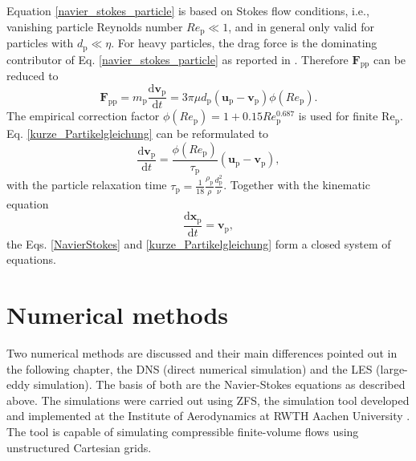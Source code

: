 \documentclass[11pt,a4paper,openany,oneside,parskip=half*]{article}
\renewcommand*\vec[1]{\boldsymbol{#1}}
\begin{document}
Equation \eqref{navier_stokes_particle} is based on Stokes flow conditions, i.e., vanishing particle Reynolds number $Re_\mathrm{p} \ll 1$, and in general only valid for particles with $d_\mathrm{p} \ll \eta$.
For heavy particles, the drag force is the dominating contributor of Eq. \eqref{navier_stokes_particle} as reported in \cite{TheImportanceOfTheFocusActingOnParticlesInTurbulentFlows}. Therefore $\vec{F}_\mathrm{pp}$ can be reduced to
\begin{equation} \label{kurze_Partikelgleichung}
\vec{F}_\mathrm{pp} =  m_\mathrm{p} \frac{\mathrm{d}\vec{v}_\mathrm{p}}{\mathrm{d}t} = 3 \pi \mu d_\mathrm{p}(\vec{u}_\mathrm{p}-\vec{v}_\mathrm{p})\phi(Re_\mathrm{p}).
\end{equation}
The empirical correction factor $\phi(Re_\mathrm{p}) = 1+0.15Re_\mathrm{p}^\mathrm{0.687}$ is used for finite $\mathrm{Re_\mathrm{p}}$. \newline Eq. \eqref{kurze_Partikelgleichung} can be reformulated to
\begin{equation} \label{shortPaticleDynamics}
\frac{\mathrm{d}\vec{v}_\mathrm{p}}{\mathrm{d}t} = \frac{\phi(Re_\mathrm{p})}{\tau_\mathrm{p}}(\vec{u}_\mathrm{p}-\vec{v}_\mathrm{p}),
\end{equation}
with the particle relaxation time $\tau_\mathrm{p}=\frac{1}{18}\frac{\rho_\mathrm{p}}{\rho}\frac{d_\mathrm{p}^\mathrm{2}}{\nu}$. 
\newline
Together with the kinematic equation    
\begin{equation}
 \frac{\mathrm{d}\vec{x}_\mathrm{p}}{\mathrm{d}t} = \vec{v}_\mathrm{p},
\end{equation}
the Eqs.  \eqref{NavierStokes} and \eqref{kurze_Partikelgleichung} form a closed system of equations.
\pagebreak
\section{Numerical methods} %
Two numerical methods are discussed and their main differences pointed out in the following chapter, the DNS (direct numerical simulation) and the LES (large-eddy simulation). The basis of both are the Navier-Stokes equations as described above. The simulations were carried out using ZFS, the simulation tool developed and implemented at the Institute of Aerodynamics at RWTH Aachen University 
\cite{anAdaptiveMultilevelMultigridFormulationForCartesianHierarchicalGridMethods} \cite{aStrictlyConservativeCartesianCutCellMethodForCompressibleViscousFlowsOnAdaptiveGrids}. 
The tool is capable of simulating compressible finite-volume flows using unstructured Cartesian grids.
\newline
\end{document}
